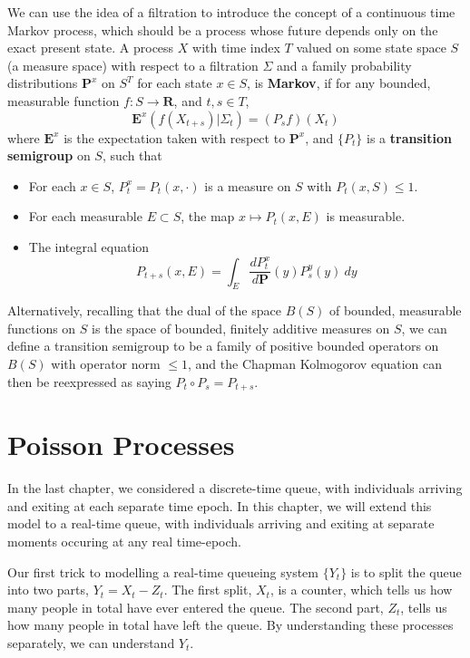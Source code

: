 We can use the idea of a filtration to introduce the concept of a continuous time Markov process, which should be a process whose future depends only on the exact present state. A process $X$ with time index $T$ valued on some state space $S$ (a measure space) with respect to a filtration $\Sigma$ and a family probability distributions $\mathbf{P}^x$ on $S^T$ for each state $x \in S$, is {\bf Markov}, if for any bounded, measurable function $f: S \to \mathbf{R}$, and $t,s \in T$,
%
\[ \mathbf{E}^x(f(X_{t + s})|\Sigma_t) = (P_s f)(X_t) \]
%
where $\mathbf{E}^x$ is the expectation taken with respect to $\mathbf{P}^x$, and $\{ P_t \}$ is a {\bf transition semigroup} on $S$, such that
%
\begin{itemize}
    \item For each $x \in S$, $P_t^x = P_t(x,\cdot)$ is a measure on $S$ with $P_t(x,S) \leq 1$.
    \item For each measurable $E \subset S$, the map $x \mapsto P_t(x,E)$ is measurable.
    \item The integral equation
    \[ P_{t+s}(x,E) = \int_E \frac{dP_t^x}{d\mathbf{P}}(y) P_s^y(y)\ dy \]
\end{itemize}
%
Alternatively, recalling that the dual of the space $B(S)$ of bounded, measurable functions on $S$ is the space of bounded, finitely additive measures on $S$, we can define a transition semigroup to be a family of positive bounded operators on $B(S)$ with operator norm $\leq 1$, and the Chapman Kolmogorov equation can then be reexpressed as saying $P_t \circ P_s = P_{t+s}$.


\section{Poisson Processes}

In the last chapter, we considered a discrete-time queue, with individuals arriving and exiting at each separate time epoch. In this chapter, we will extend this model to a real-time queue, with individuals arriving and exiting at separate moments occuring at any real time-epoch.

Our first trick to modelling a real-time queueing system $\{ Y_t \}$ is to split the queue into two parts, $Y_t = X_t - Z_t$. The first split, $X_t$, is a counter, which tells us how many people in total have ever entered the queue. The second part, $Z_t$, tells us how many people in total have left the queue. By understanding these processes separately, we can understand $Y_t$.

